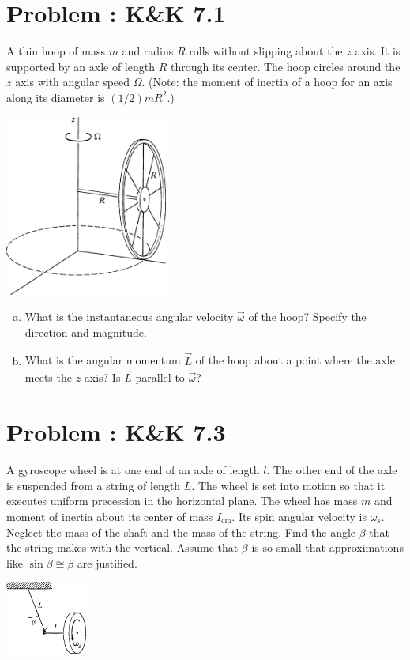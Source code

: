 \documentclass[problems]{esg8012pset}
\date{\today }
\begin{document}
\section{Problem \thesection: K\&K 7.1}
  A thin hoop of mass $m$ and radius $R$ rolls without slipping about the $z$ axis. It is supported by an axle of length $R$ through its center. The hoop circles around the $z$ axis with angular speed $\Omega$. (Note: the moment of inertia of a hoop for an axis along its diameter is $(1 / 2)mR^2$.)
  \begin{center}\includegraphics[width=0.4\textwidth]{ps11_1}\end{center}
  \begin{enumerate}[(a)]
    \item What is the instantaneous angular velocity $\vec \omega$ of the hoop? Specify the direction and magnitude.
    \item What is the angular momentum $\vec L$ of the hoop about a point where the axle meets the $z$ axis? Is $\vec L$ parallel to $\vec \omega$?
  \end{enumerate}
\section{Problem \thesection: K\&K 7.3}
  A gyroscope wheel is at one end of an axle of length $l$. The other end of the axle is suspended from a string of length $L$. The wheel is set into motion so that it executes uniform precession in the horizontal plane. The wheel has mass $m$ and moment of inertia about its center of mass $I_\text{cm}$. Its spin angular velocity is $\omega_s$. Neglect the mass of the shaft and the mass of the string. Find the angle $\beta$ that the string makes with the vertical. Assume that $\beta$ is so small that approximations like $\sin\beta \cong \beta$ are justified.
  \begin{center}\includegraphics[width=0.2\textwidth]{ps11_2}\end{center}
\end{document}
